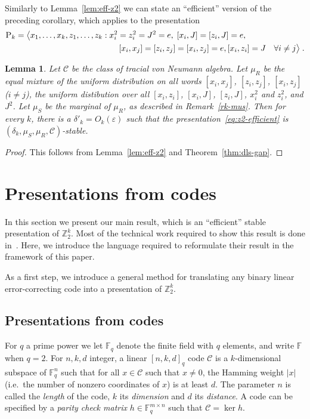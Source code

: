 \documentclass[11pt]{article}
\newtheorem{lemma}[theorem]{Lemma}
\theoremstyle{definition}
\newcommand{\code}{\mathscr{C}}
\newcommand{\F}{\ensuremath{\mathbb{F}}}
\newcommand{\Z}{\ensuremath{\mathbb{Z}}}
\newcommand{\mC}{\ensuremath{\mathcal{C}}}
\newcommand{\eps}{\varepsilon}
\newcommand{\gamestyle}[1]{\ensuremath{\textsc{#1}}\xspace}
\newcommand{\pauli}{\gamestyle{P}}
\begin{document}
Similarly to Lemma~\ref{lem:eff-z2} we can state an ``efficient'' version of the preceding corollary, which applies to the presentation
\begin{align}
 \pauli_k = \big\langle x_1,\ldots,x_k,z_1,\ldots,z_k &: x_i^2=z_i^2=J^2=e,\; [x_i,J]=[z_i,J]=e,\notag\\
&\qquad  [x_i,x_j]=[z_i,z_j]=[x_i,z_j]=e, [x_i,z_i]=J \quad \forall i\neq j \big\rangle\;.\label{eq:pauli-efficient}
\end{align}

\begin{lemma}\label{lem:eff-pauli}
  Let $\mC$ be the class of tracial von Neumann algebra. Let $\mu_R$ be the equal mixture of the uniform distribution on all words $ [x_i,x_j]$, $[z_i,z_j]$, $[x_i,z_j]$ ($i\neq j$), the uniform distibution over all $[x_i,z_i]$, $[x_i,J]$, $[z_i,J]$, $x_i^2$ and $z_i^2$, and $J^2$. Let $\mu_S$ be the marginal of $\mu_R$, as described in Remark~\ref{rk-mus}. Then 
  for every $k$, there is a $\delta'_k = O_k(\eps)$ such that the presentation~\eqref{eq:z2-efficient} is $(\delta_k,\mu_S,\mu_R,\mC)$-stable.
\end{lemma}

\begin{proof}
This follows from Lemma~\ref{lem:eff-z2} and Theorem~\ref{thm:dls-gap}.
\end{proof}

\section{Presentations from codes}
\label{sec:pres-codes}

In this section we present our main result, which is an ``efficient'' stable presentation of $\Z_2^k$. Most of the technical work required to show this result is done in~\cite{ji2020mip}. Here, we introduce the language required to reformulate their result in the framework of this paper. 

As a first step, we introduce a general method for translating any binary linear error-correcting code into a presentation of $\Z_2^k$. 

\subsection{Presentations from codes}
\label{sec:pres-code}

For $q$ a prime power we let $\F_q$ denote the finite field with $q$ elements, and write $\F$ when $q=2$. 
For $n,k,d$ integer, a linear $[n,k,d]_q$ code $\code$ is a $k$-dimensional subspace of $\F_q^n$ such that for all $x\in \code$ such that $x\neq 0$, the Hamming weight $|x|$ (i.e.\ the number of nonzero coordinates of $x$) is at least $d$. The parameter $n$ is called the \emph{length} of the code, $k$ its \emph{dimension} and $d$ its \emph{distance}. A code can be specified by a \emph{parity check matrix} $h\in \F_q^{m\times n}$ such that $\code = \ker h$. 
\end{document}
